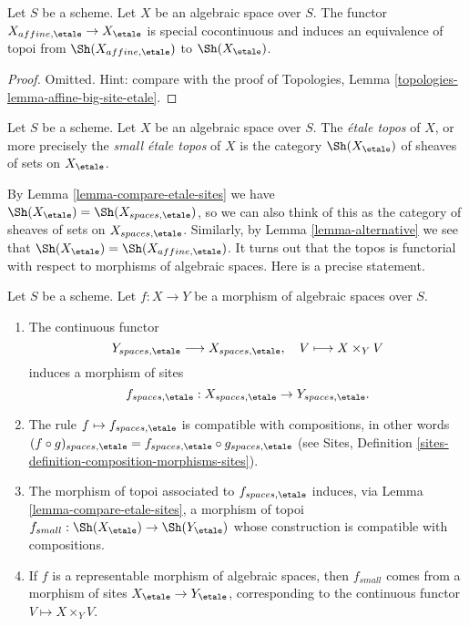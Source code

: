 \begin{lemma}
\label{lemma-alternative}
Let $S$ be a scheme. Let $X$ be an algebraic space over $S$.
The functor $X_{affine, \etale} \to X_\etale$
is special cocontinuous and induces an equivalence of topoi from
$\Sh(X_{affine, \etale})$ to $\Sh(X_\etale)$.
\end{lemma}

\begin{proof}
Omitted. Hint: compare with the proof of
Topologies, Lemma \ref{topologies-lemma-affine-big-site-etale}.
\end{proof}

\begin{definition}
\label{definition-etale-topos}
Let $S$ be a scheme. Let $X$ be an algebraic space over $S$.
The {\it \'etale topos} of $X$, or more precisely the
{\it small \'etale topos} of $X$ is the category
$\Sh(X_\etale)$
of sheaves of sets on $X_\etale$.
\end{definition}

\noindent
By
Lemma \ref{lemma-compare-etale-sites}
we have
$\Sh(X_\etale) = \Sh(X_{spaces, \etale})$,
so we can also think of this as the category of sheaves of sets on
$X_{spaces, \etale}$. Similarly, by
Lemma \ref{lemma-alternative}
we see that
$\Sh(X_\etale) = \Sh(X_{affine, \etale})$.
It turns out that the topos is functorial with respect to morphisms
of algebraic spaces. Here is a precise statement.

\begin{lemma}
\label{lemma-functoriality-etale-site}
Let $S$ be a scheme.
Let $f : X \to Y$ be a morphism of algebraic spaces over $S$.
\begin{enumerate}
\item The continuous functor
$$
Y_{spaces, \etale} \longrightarrow X_{spaces, \etale}, \quad
V \longmapsto X \times_Y V
$$
induces a morphism of sites
$$
f_{spaces, \etale} :
X_{spaces, \etale}
\to
Y_{spaces, \etale}.
$$
\item The rule $f \mapsto f_{spaces, \etale}$ is compatible with
compositions, in other words $(f \circ g)_{spaces, \etale}
= f_{spaces, \etale} \circ g_{spaces, \etale}$ (see
Sites, Definition \ref{sites-definition-composition-morphisms-sites}).
\item The morphism of topoi associated to $f_{spaces, \etale}$
induces, via Lemma \ref{lemma-compare-etale-sites}, a morphism of topoi
$f_{small} : \Sh(X_\etale) \to \Sh(Y_\etale)$
whose construction is compatible with compositions.
\item If $f$ is a representable morphism of algebraic spaces,
then $f_{small}$ comes from a morphism of sites
$X_\etale \to Y_\etale$,
corresponding to the continuous functor $V \mapsto X \times_Y V$.
\end{enumerate}
\end{lemma}

